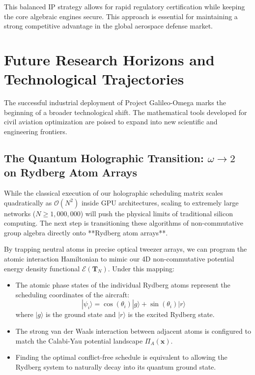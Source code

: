 \documentclass[11pt,a4paper]{book}
\begin{document}
This balanced IP strategy allows for rapid regulatory certification while keeping the core algebraic engines secure. This approach is essential for maintaining a strong competitive advantage in the global aerospace defense market.

\section{Future Research Horizons and Technological Trajectories}\label{sec:ch10_future_horizons}

The successful industrial deployment of Project Galileo-Omega marks the beginning of a broader technological shift. The mathematical tools developed for civil aviation optimization are poised to expand into new scientific and engineering frontiers.

\subsection{The Quantum Holographic Transition: $\omega \to 2$ on Rydberg Atom Arrays}

While the classical execution of our holographic scheduling matrix scales quadratically as $\mathcal{O}(N^2)$ inside GPU architectures, scaling to extremely large networks ($N \ge 1,000,000$) will push the physical limits of traditional silicon computing. The next step is transitioning these algorithms of non-commutative group algebra directly onto **Rydberg atom arrays**.

By trapping neutral atoms in precise optical tweezer arrays, we can program the atomic interaction Hamiltonian to mimic our 4D non-commutative potential energy density functional $\mathcal{E}(\mathbf{T}_N)$. Under this mapping:
\begin{itemize}
    \item The atomic phase states of the individual Rydberg atoms represent the scheduling coordinates of the aircraft:
    \begin{equation}
    \label{eq:rydberg_mapping}
    | \psi_i \rangle = \cos(\theta_i)|g\rangle + \sin(\theta_i)|r\rangle
    \end{equation}
    where $|g\rangle$ is the ground state and $|r\rangle$ is the excited Rydberg state.
    \item The strong van der Waals interaction between adjacent atoms is configured to match the Calabi-Yau potential landscape $\Pi_A(\mathbf{x})$.
    \item Finding the optimal conflict-free schedule is equivalent to allowing the Rydberg system to naturally decay into its quantum ground state.
\end{itemize}
\end{document}
